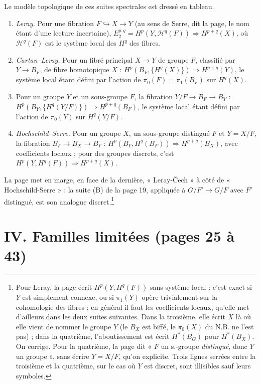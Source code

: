\documentclass[11pt,a4paper]{article}
\begin{document}
Le modèle topologique de ces suites spectrales est dressé en tableau.
\begin{enumerate}
\item[--] \emph{Leray.} Pour une fibration $F \hookrightarrow X \to Y$ (au
sens de Serre, dit la page, le nom étant d'une lecture incertaine),
$E_2^{p,q} = H^{p}(Y, \mathcal{H}^{q}(F)) \Rightarrow H^{p+q}(X)$, où
$\mathcal{H}^{q}(F)$ est le système local des $H^{q}$ des fibres.
\item[--] \emph{Cartan--Leray.} Pour un fibré principal $X \to Y$ de groupe
$F$, classifié par $Y \to B_F$, de fibre homotopique $X$ :
$H^{p}(B_F, \{H^{q}(X)\}) \Rightarrow H^{p+q}(Y)$, le système local étant
défini par l'action de $\pi_0(F) = \pi_1(B_F)$ sur $H^{q}(X)$.
\item[--] Pour un groupe $Y$ et un sous-groupe $F$, la fibration
$Y/F \to B_F \to B_Y$ : $H^{p}(B_Y, \{H^{q}(Y/F)\}) \Rightarrow
H^{p+q}(B_F)$, le système local étant défini par l'action de $\pi_0(Y)$ sur
$H^{q}(Y/F)$.
\item[--] \emph{Hochschild--Serre.} Pour un groupe $X$, un sous-groupe
distingué $F$ et $Y = X/F$, la fibration $B_F \to B_X \to B_Y$ :
$H^{p}(B_Y, H^{q}(B_F)) \Rightarrow H^{p+q}(B_X)$, avec coefficients locaux ;
pour des groupes discrets, c'est
$H^{p}(Y, H^{q}(F)) \Rightarrow H^{p+q}(X)$.
\end{enumerate}
La page met en marge, en face de la dernière, « Leray-Čech » à côté de
« Hochschild-Serre » : la suite (B) de la page 19, appliquée à
$G/F' \to G/F$ avec $F'$ distingué, est son analogue discret.\footnote{Pour
Leray, la page écrit $H^{p}(Y, H^{q}(F))$ sans système local : c'est exact si
$Y$ est simplement connexe, ou si $\pi_1(Y)$ opère trivialement sur la
cohomologie des fibres ; en général il faut les coefficients locaux, qu'elle
met d'ailleurs dans les deux suites suivantes. Dans la troisième, elle écrit
$X$ là où elle vient de nommer le groupe $Y$ (le $B_X$ est biffé, le
$\pi_0(X)$ du N.B. ne l'est pas) ; dans la quatrième, l'aboutissement est
écrit $H^{*}(B_G)$ pour $H^{*}(B_X)$. On corrige. Pour la quatrième, la page
dit « $F$ un s.-groupe \emph{distingué}, donc $Y$ un groupe », sans écrire
$Y = X/F$, qu'on explicite. Trois lignes serrées entre
la troisième et la quatrième, sur le cas où $Y$ est discret, sont
illisibles sauf leurs symboles.}

\section*{IV. Familles limitées (pages 25 à 43)}
\end{document}
